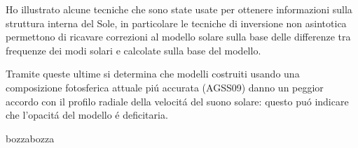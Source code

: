 \documentclass[twoside,11pt,fleqn]{memoir}%
\def\versione{bozza}%
\def\bozza{bozza}
\begin{document}
Ho illustrato alcune tecniche che sono state usate per ottenere informazioni sulla struttura interna del Sole, in particolare le tecniche di inversione non asintotica permettono di ricavare correzioni al modello solare sulla base delle differenze tra frequenze dei modi solari e calcolate sulla base del modello.

Tramite queste ultime si determina che modelli costruiti usando una composizione fotosferica attuale pi\'u accurata (AGSS09) danno un peggior accordo con il profilo radiale della velocit\'a del suono solare: questo pu\'o indicare che l'opacit\'a del modello \'e deficitaria.


{\let\clearpage\relax\let\cleardoublepage\relax
\backmatter
}

%
\printbibliography


\ifx\versione\bozza
\woc
\erratac
\fi
\end{document}
